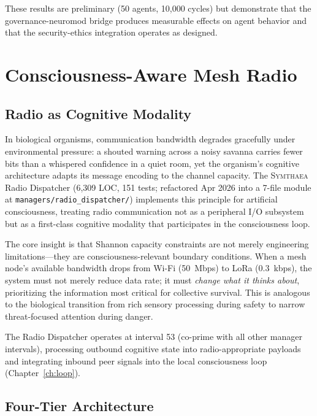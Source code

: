 \documentclass[12pt]{book}
\newcommand{\symthaea}{\textsc{Symthaea}}
\begin{document}
These results are preliminary (50 agents, 10,000 cycles) but demonstrate that the governance-neuromod bridge produces measurable effects on agent behavior and that the security-ethics integration operates as designed.


\chapter{Consciousness-Aware Mesh Radio}
\label{ch:meshradio}

\section{Radio as Cognitive Modality}

In biological organisms, communication bandwidth degrades gracefully under environmental pressure: a shouted warning across a noisy savanna carries fewer bits than a whispered confidence in a quiet room, yet the organism's cognitive architecture adapts its message encoding to the channel capacity. The \symthaea{} Radio Dispatcher (6,309 LOC, 151 tests; refactored Apr 2026 into a 7-file module at \texttt{managers/radio\_dispatcher/}) implements this principle for artificial consciousness, treating radio communication not as a peripheral I/O subsystem but as a first-class cognitive modality that participates in the consciousness loop.

The core insight is that Shannon capacity constraints are not merely engineering limitations---they are consciousness-relevant boundary conditions. When a mesh node's available bandwidth drops from Wi-Fi (50~Mbps) to LoRa (0.3~kbps), the system must not merely reduce data rate; it must \textit{change what it thinks about}, prioritizing the information most critical for collective survival. This is analogous to the biological transition from rich sensory processing during safety to narrow threat-focused attention during danger.

The Radio Dispatcher operates at interval 53 (co-prime with all other manager intervals), processing outbound cognitive state into radio-appropriate payloads and integrating inbound peer signals into the local consciousness loop (Chapter~\ref{ch:loop}).

\section{Four-Tier Architecture}
\end{document}
